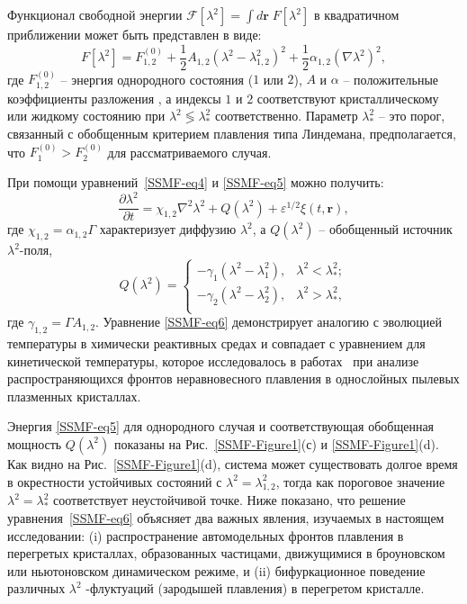 Функционал свободной энергии $\mathcal{F}[\lambda^2] = \int{d\mathbf{r}\;F[\lambda^2]}$ в квадратичном приближении может быть представлен в виде:
\begin{equation}
  \label{SSMF-eq5}
  F[\lambda^2] = F_{\mathrm{1,2}}^{(0)}+\frac{1}{2}A_{1,2}\left(\lambda^2-\lambda_{1,2}^2\right)^2 + \frac{1}{2}\alpha_{1,2}\left(\nabla\lambda^2\right)^2,
\end{equation}
где $F_{1,2}^{(0)}$ -- энергия однородного состояния ($1$ или $2$), $A$ и $\alpha$ -- положительные коэффициенты разложения \cite{book.desai}, а индексы $ 1 $ и $ 2 $ соответствуют кристаллическому или жидкому состоянию при $\lambda^2 \lessgtr \lambda_\ast^2$ соответственно.
Параметр $\lambda_\ast^2 $ -- это порог, связанный с обобщенным критерием плавления типа Линдемана, предполагается, что $ F_{\mathrm{1}} ^ {(0)}> F_{\mathrm{2}} ^ {(0)}$ для рассматриваемого случая.

При помощи уравнений~\eqref{SSMF-eq4} и \eqref{SSMF-eq5} можно получить:
\begin{equation}
  \label{SSMF-eq6}
  \frac{\partial \lambda^2}{\partial t} = \chi_{1,2} \nabla^2\lambda^2 + Q(\lambda^2) +  \varepsilon^{1/2}\xi(t,\mathbf{r}),
\end{equation}
где $ \chi_{1,2} = \alpha_{1,2} \Gamma$ характеризует диффузию $\lambda^2$,
а $ Q (\lambda ^ 2) $ -- обобщенный источник $ \lambda^2$-поля,
\begin{equation}
  \label{SSMF-eq7}
  Q(\lambda^2) =
  \left\{
    \begin{array}{ll}
      -\gamma_{1}\left(\lambda^2-\lambda_{1}^2\right), & \lambda^2  < \lambda_\ast^2;\\
      -\gamma_{2}\left(\lambda^2-\lambda_{2}^2\right), & \lambda^2 > \lambda_\ast^2,\\
    \end{array}
  \right.
\end{equation}
где $\gamma_{1,2} = \Gamma A_{1,2}$.
Уравнение \eqref{SSMF-eq6} демонстрирует аналогию с эволюцией температуры в химически реактивных средах \cite{10.1088/0004-637x/805/1/59} и совпадает с уравнением для кинетической температуры, которое исследовалось в работах~\cite{10.1103/physreve.96.043201, 10.1103/physreve.97.043206, 10.1103/physreve.100.023203} при анализе распространяющихся фронтов неравновесного плавления в однослойных пылевых плазменных кристаллах.

Энергия \eqref{SSMF-eq5} для однородного случая и соответствующая обобщенная мощность $ Q (\lambda ^ 2) $ показаны на Рис.~\ref{SSMF-Figure1}(с) и \ref{SSMF-Figure1}(d).
Как видно на Рис.~\ref{SSMF-Figure1}(d), система может существовать долгое время в окрестности устойчивых состояний с $\lambda^2= \lambda_{1,2} ^ 2 $, тогда как пороговое значение $\lambda^2=\lambda_\ast^2$ соответствует неустойчивой точке.
Ниже показано, что решение уравнения~\eqref{SSMF-eq6} объясняет два важных явления, изучаемых в настоящем исследовании:
(i) распространение автомодельных фронтов плавления в перегретых кристаллах, образованных частицами, движущимися в броуновском или ньютоновском динамическом режиме, и (ii) бифуркационное поведение различных $\lambda^2$ -флуктуаций (зародышей плавления) в перегретом кристалле.

